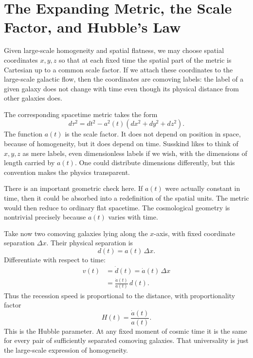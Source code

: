 \section{The Expanding Metric, the Scale Factor, and Hubble's Law}

Given large-scale homogeneity and spatial flatness, we may choose spatial coordinates \(x,y,z\) so that at each fixed time the spatial part of the metric is Cartesian up to a common scale factor. If we attach these coordinates to the large-scale galactic flow, then the coordinates are comoving labels: the label of a given galaxy does not change with time even though its physical distance from other galaxies does.

The corresponding spacetime metric takes the form
\begin{equation}
d\tau^2 = dt^2 - a^2(t)\left(dx^2+dy^2+dz^2\right).
\end{equation}
The function \(a(t)\) is the scale factor. It does not depend on position in space, because of homogeneity, but it does depend on time. Susskind likes to think of \(x,y,z\) as mere labels, even dimensionless labels if we wish, with the dimensions of length carried by \(a(t)\). One could distribute dimensions differently, but this convention makes the physics transparent.

There is an important geometric check here. If \(a(t)\) were actually constant in time, then it could be absorbed into a redefinition of the spatial units. The metric would then reduce to ordinary flat spacetime. The cosmological geometry is nontrivial precisely because \(a(t)\) varies with time.

Take now two comoving galaxies lying along the \(x\)-axis, with fixed coordinate separation \(\Delta x\). Their physical separation is
\begin{equation}
d(t) = a(t)\,\Delta x.
\end{equation}
Differentiate with respect to time:
\begin{align}
v(t) &= \dot d(t)
      = \dot a(t)\,\Delta x \\
     &= \frac{\dot a(t)}{a(t)}\,d(t).
\end{align}
Thus the recession speed is proportional to the distance, with proportionality factor
\begin{equation}
H(t) = \frac{\dot a(t)}{a(t)}.
\end{equation}
This is the Hubble parameter. At any fixed moment of cosmic time it is the same for every pair of sufficiently separated comoving galaxies. That universality is just the large-scale expression of homogeneity.

